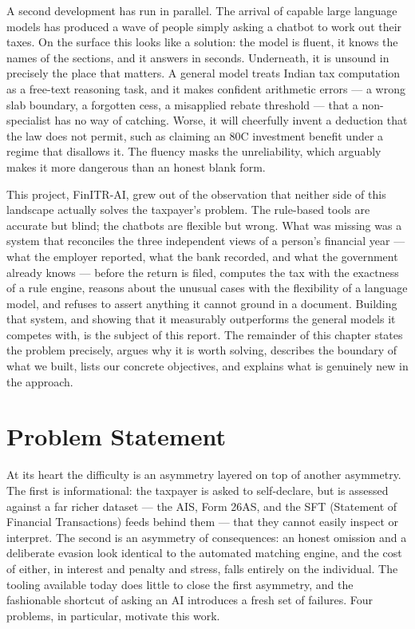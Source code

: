 \documentclass[12pt, a4paper, oneside]{report}
\begin{document}
A second development has run in parallel. The arrival of capable large language
models has produced a wave of people simply asking a chatbot to work out their
taxes. On the surface this looks like a solution: the model is fluent, it knows
the names of the sections, and it answers in seconds. Underneath, it is unsound
in precisely the place that matters. A general model treats Indian tax
computation as a free-text reasoning task, and it makes confident arithmetic
errors --- a wrong slab boundary, a forgotten cess, a misapplied rebate
threshold --- that a non-specialist has no way of catching. Worse, it will
cheerfully invent a deduction that the law does not permit, such as claiming an
80C investment benefit under a regime that disallows it. The fluency masks the
unreliability, which arguably makes it more dangerous than an honest blank form.

This project, FinITR-AI, grew out of the observation that neither side of this
landscape actually solves the taxpayer's problem. The rule-based tools are
accurate but blind; the chatbots are flexible but wrong. What was missing was a
system that reconciles the three independent views of a person's financial year
--- what the employer reported, what the bank recorded, and what the government
already knows --- before the return is filed, computes the tax with the
exactness of a rule engine, reasons about the unusual cases with the flexibility
of a language model, and refuses to assert anything it cannot ground in a
document. Building that system, and showing that it measurably outperforms the
general models it competes with, is the subject of this report. The remainder of
this chapter states the problem precisely, argues why it is worth solving,
describes the boundary of what we built, lists our concrete objectives, and
explains what is genuinely new in the approach.

\section{Problem Statement}
\label{sec:problem-statement}

At its heart the difficulty is an asymmetry layered on top of another asymmetry.
The first is informational: the taxpayer is asked to self-declare, but is
assessed against a far richer dataset --- the AIS, Form 26AS, and the SFT
(Statement of Financial Transactions) feeds behind them --- that they cannot
easily inspect or interpret. The second is an asymmetry of consequences: an
honest omission and a deliberate evasion look identical to the automated
matching engine, and the cost of either, in interest and penalty and stress,
falls entirely on the individual. The tooling available today does little to
close the first asymmetry, and the fashionable shortcut of asking an AI
introduces a fresh set of failures. Four problems, in particular, motivate this
work.
\end{document}
